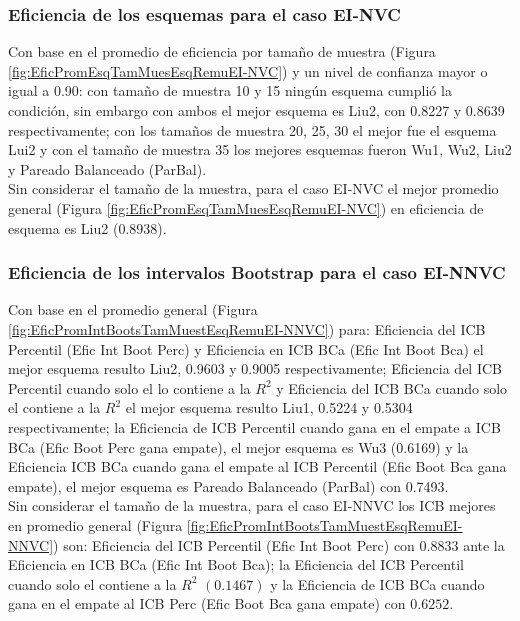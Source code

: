\subsubsection{Eficiencia de los esquemas para el caso EI-NVC}
Con base en el promedio de eficiencia por tamaño de muestra (Figura \ref{fig:EficPromEsqTamMuesEsqRemuEI-NVC}) y un nivel de confianza mayor o igual a 0.90: con tamaño de muestra 10 y 15 ningún esquema cumplió la condición, sin embargo con ambos el mejor esquema es Liu2, con 0.8227 y 0.8639 respectivamente; con los tamaños de muestra 20, 25, 30 el mejor fue el esquema Lui2 y con el tamaño de muestra 35 los mejores esquemas fueron Wu1, Wu2, Liu2 y Pareado Balanceado (ParBal).\\

Sin considerar el tamaño de la muestra, para el caso EI-NVC el mejor promedio general (Figura \ref{fig:EficPromEsqTamMuesEsqRemuEI-NVC}) en eficiencia de esquema es Liu2 (0.8938).





\subsubsection{Eficiencia de los intervalos Bootstrap para el caso EI-NNVC}
Con base en el promedio general (Figura \ref{fig:EficPromIntBootsTamMuestEsqRemuEI-NNVC}) para: Eficiencia del ICB Percentil (Efic Int Boot Perc) y Eficiencia en ICB BCa (Efic Int Boot Bca) el mejor esquema resulto Liu2, 0.9603 y 0.9005 respectivamente;
 Eficiencia del ICB Percentil cuando solo el lo contiene a la $R^{2}$ y Eficiencia del ICB BCa cuando solo el contiene a la $R^{2}$ el mejor esquema resulto Liu1, 0.5224 y 0.5304 respectivamente; la Eficiencia de ICB Percentil cuando gana en el empate a ICB BCa (Efic Boot Perc gana empate), el mejor esquema es Wu3 (0.6169) y la Eficiencia ICB BCa cuando gana el empate al ICB Percentil (Efic Boot Bca gana empate), el mejor esquema es Pareado Balanceado (ParBal) con 0.7493.\\

Sin considerar el tamaño de la muestra, para el caso EI-NNVC los ICB mejores en promedio general (Figura \ref{fig:EficPromIntBootsTamMuestEsqRemuEI-NNVC}) son: Eficiencia del ICB Percentil (Efic Int Boot Perc) con $0.8833$ ante la Eficiencia en ICB BCa (Efic Int Boot Bca); la Eficiencia del ICB Percentil cuando solo el contiene a la $R^{2}$ $(0.1467)$ y la Eficiencia de ICB BCa cuando gana en el empate al ICB Perc (Efic Boot Bca gana empate) con $0.6252$.




